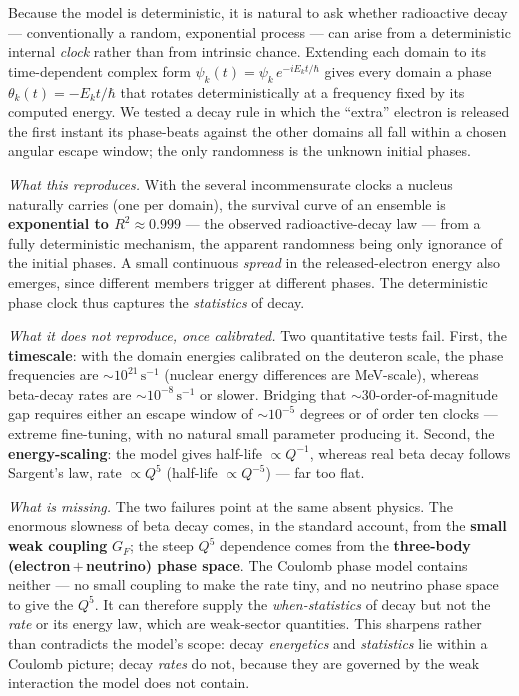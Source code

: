 \documentclass[11pt]{article}
\begin{document}
Because the model is deterministic, it is natural to ask whether radioactive decay --- conventionally
a random, exponential process --- can arise from a deterministic internal \emph{clock} rather than from
intrinsic chance. Extending each domain to its time-dependent complex form
$\psi_k(t)=\psi_k\,e^{-iE_kt/\hbar}$ gives every domain a phase $\theta_k(t)=-E_kt/\hbar$ that rotates
deterministically at a frequency fixed by its computed energy. We tested a decay rule in which the
``extra'' electron is released the first instant its phase-beats against the other domains all fall
within a chosen angular escape window; the only randomness is the unknown initial phases.

\emph{What this reproduces.} With the several incommensurate clocks a nucleus naturally carries (one per
domain), the survival curve of an ensemble is \textbf{exponential to $R^2\approx 0.999$} --- the observed
radioactive-decay law --- from a fully deterministic mechanism, the apparent randomness being only
ignorance of the initial phases. A small continuous \emph{spread} in the released-electron energy also
emerges, since different members trigger at different phases. The deterministic phase clock thus captures
the \emph{statistics} of decay.

\emph{What it does not reproduce, once calibrated.} Two quantitative tests fail. First, the
\textbf{timescale}: with the domain energies calibrated on the deuteron scale, the phase frequencies are
$\sim\!10^{21}\,\mathrm{s}^{-1}$ (nuclear energy differences are MeV-scale), whereas beta-decay rates are
$\sim\!10^{-8}\,\mathrm{s}^{-1}$ or slower. Bridging that $\sim\!30$-order-of-magnitude gap requires either
an escape window of $\sim\!10^{-5}$ degrees or of order ten clocks --- extreme fine-tuning, with no natural
small parameter producing it. Second, the \textbf{energy-scaling}: the model gives half-life
$\propto Q^{-1}$, whereas real beta decay follows Sargent's law, rate $\propto Q^{5}$ (half-life
$\propto Q^{-5}$) --- far too flat.

\emph{What is missing.} The two failures point at the same absent physics. The enormous slowness of beta
decay comes, in the standard account, from the \textbf{small weak coupling} $G_F$; the steep $Q^5$
dependence comes from the \textbf{three-body (electron\,$+$\,neutrino) phase space}. The Coulomb phase model
contains neither --- no small coupling to make the rate tiny, and no neutrino phase space to give the
$Q^5$. It can therefore supply the \emph{when-statistics} of decay but not the \emph{rate} or its energy
law, which are weak-sector quantities. This sharpens rather than contradicts the model's scope: decay
\emph{energetics} and \emph{statistics} lie within a Coulomb picture; decay \emph{rates} do not, because
they are governed by the weak interaction the model does not contain.
\end{document}
